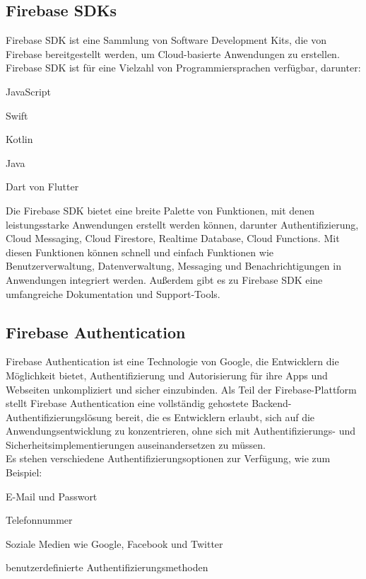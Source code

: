 \subsection{Firebase SDKs}
Firebase SDK ist eine Sammlung von Software Development Kits, die von Firebase bereitgestellt werden, um Cloud-basierte Anwendungen zu erstellen.
Firebase SDK ist für eine Vielzahl von Programmiersprachen verfügbar, darunter:
\begin{compactitem}
    \item JavaScript
    \item Swift
    \item Kotlin
    \item Java
    \item Dart von Flutter
\end{compactitem}
Die Firebase SDK bietet eine breite Palette von Funktionen, mit denen leistungsstarke Anwendungen erstellt werden können, darunter Authentifizierung, Cloud Messaging, Cloud Firestore, Realtime Database, Cloud Functions. Mit diesen Funktionen können schnell und einfach Funktionen wie Benutzerverwaltung, Datenverwaltung, Messaging und Benachrichtigungen in Anwendungen integriert werden. Außerdem gibt es zu Firebase SDK eine umfangreiche Dokumentation und Support-Tools.


\subsection{Firebase Authentication}
\author{Sandin Habibovic}

Firebase Authentication ist eine Technologie von Google, die Entwicklern die Möglichkeit bietet, Authentifizierung und Autorisierung für ihre Apps und Webseiten unkompliziert und sicher einzubinden. Als Teil der Firebase-Plattform stellt Firebase Authentication eine vollständig gehostete Backend-Authentifizierungslösung bereit, die es Entwicklern erlaubt, sich auf die Anwendungsentwicklung zu konzentrieren, ohne sich mit Authentifizierungs- und Sicherheitsimplementierungen auseinandersetzen zu müssen.
\\
Es stehen verschiedene Authentifizierungsoptionen zur Verfügung, wie zum Beispiel:
\begin{compactitem}
    \item E-Mail und Passwort
    \item Telefonnummer
    \item Soziale Medien wie Google, Facebook und Twitter
    \item benutzerdefinierte Authentifizierungsmethoden
\end{compactitem}


